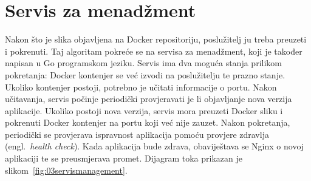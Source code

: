 \section{Servis za menadžment}
Nakon što je slika objavljena na Docker repositoriju, poslužitelj ju treba preuzeti i pokrenuti.
Taj algoritam pokreće se na servisa za menadžment, koji je također napisan u Go programskom jeziku.
Servis ima dva moguća stanja prilikom pokretanja: Docker kontenjer se već izvodi na poslužitelju te
prazno stanje. Ukoliko kontenjer postoji, potrebno je učitati informacije o portu. Nakon učitavanja,
servis počinje periodički provjeravati je li objavljanje nova verzija aplikacije.  Ukoliko postoji
nova verzija, servis mora preuzeti Docker sliku i pokrenuti Docker kontenjer na portu koji već nije
zauzet. Nakon pokretanja, periodički se provjerava ispravnost aplikacija pomoću provjere zdravlja
(engl.~\textit{health check}). Kada aplikacija bude zdrava, obaviještava se Nginx o novoj aplikaciji
te se preusmjerava promet. Dijagram toka prikazan je slikom~\ref{fig:03servismanagement}.

